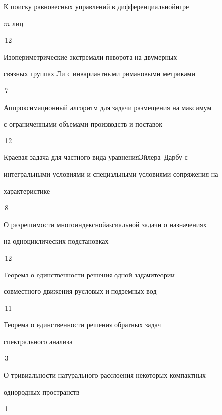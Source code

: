 

{К поиску равновесных управлений в дифференциальной\newline игре


$m$ лиц}{\No\,12}




{Изопериметрические экстремали поворота на двумерных \newline


связных группах Ли с инвариантными римановыми метриками}{\No\,7}






{Аппроксимационный алгоритм для задачи размещения на максимум\newline


с ограниченными объемами производств и поставок}{\No\,12}




{Краевая задача для частного вида уравнения\newline Эйлера--Дарбу с 


интегральными условиями и специальными условиями сопряжения на \newline


характеристике}{\No\,8}




{О разрешимости многоиндексной\newline аксиальной задачи о назначениях


на одноциклических подстановках}{\No\,12}




{Теорема о единственности решения одной задачи\newline теории


совместного движения русловых и подземных вод}{\No\,11}




{Теорема о единственности решения обратных задач\newline


спектрального анализа}{\No\,3}




{О тривиальности натурального расслоения некоторых компактных\newline


однородных пространств}{\No\,1}


